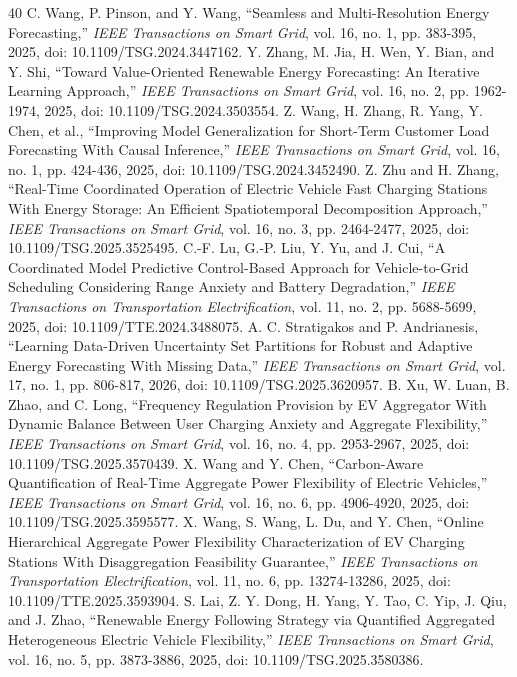 \documentclass[journal]{IEEEtran}
\begin{document}
\begin{thebibliography}{40}
 C. Wang, P. Pinson, and Y. Wang, ``Seamless and Multi-Resolution Energy Forecasting,'' \emph{IEEE Transactions on Smart Grid}, vol. 16, no. 1, pp. 383-395, 2025, doi: 10.1109/TSG.2024.3447162.
 Y. Zhang, M. Jia, H. Wen, Y. Bian, and Y. Shi, ``Toward Value-Oriented Renewable Energy Forecasting: An Iterative Learning Approach,'' \emph{IEEE Transactions on Smart Grid}, vol. 16, no. 2, pp. 1962-1974, 2025, doi: 10.1109/TSG.2024.3503554.
 Z. Wang, H. Zhang, R. Yang, Y. Chen, et al., ``Improving Model Generalization for Short-Term Customer Load Forecasting With Causal Inference,'' \emph{IEEE Transactions on Smart Grid}, vol. 16, no. 1, pp. 424-436, 2025, doi: 10.1109/TSG.2024.3452490.
 Z. Zhu and H. Zhang, ``Real-Time Coordinated Operation of Electric Vehicle Fast Charging Stations With Energy Storage: An Efficient Spatiotemporal Decomposition Approach,'' \emph{IEEE Transactions on Smart Grid}, vol. 16, no. 3, pp. 2464-2477, 2025, doi: 10.1109/TSG.2025.3525495.
 C.-F. Lu, G.-P. Liu, Y. Yu, and J. Cui, ``A Coordinated Model Predictive Control-Based Approach for Vehicle-to-Grid Scheduling Considering Range Anxiety and Battery Degradation,'' \emph{IEEE Transactions on Transportation Electrification}, vol. 11, no. 2, pp. 5688-5699, 2025, doi: 10.1109/TTE.2024.3488075.
 A. C. Stratigakos and P. Andrianesis, ``Learning Data-Driven Uncertainty Set Partitions for Robust and Adaptive Energy Forecasting With Missing Data,'' \emph{IEEE Transactions on Smart Grid}, vol. 17, no. 1, pp. 806-817, 2026, doi: 10.1109/TSG.2025.3620957.
 B. Xu, W. Luan, B. Zhao, and C. Long, ``Frequency Regulation Provision by EV Aggregator With Dynamic Balance Between User Charging Anxiety and Aggregate Flexibility,'' \emph{IEEE Transactions on Smart Grid}, vol. 16, no. 4, pp. 2953-2967, 2025, doi: 10.1109/TSG.2025.3570439.
 X. Wang and Y. Chen, ``Carbon-Aware Quantification of Real-Time Aggregate Power Flexibility of Electric Vehicles,'' \emph{IEEE Transactions on Smart Grid}, vol. 16, no. 6, pp. 4906-4920, 2025, doi: 10.1109/TSG.2025.3595577.
 X. Wang, S. Wang, L. Du, and Y. Chen, ``Online Hierarchical Aggregate Power Flexibility Characterization of EV Charging Stations With Disaggregation Feasibility Guarantee,'' \emph{IEEE Transactions on Transportation Electrification}, vol. 11, no. 6, pp. 13274-13286, 2025, doi: 10.1109/TTE.2025.3593904.
 S. Lai, Z. Y. Dong, H. Yang, Y. Tao, C. Yip, J. Qiu, and J. Zhao, ``Renewable Energy Following Strategy via Quantified Aggregated Heterogeneous Electric Vehicle Flexibility,'' \emph{IEEE Transactions on Smart Grid}, vol. 16, no. 5, pp. 3873-3886, 2025, doi: 10.1109/TSG.2025.3580386.

\end{thebibliography}
\end{document}
